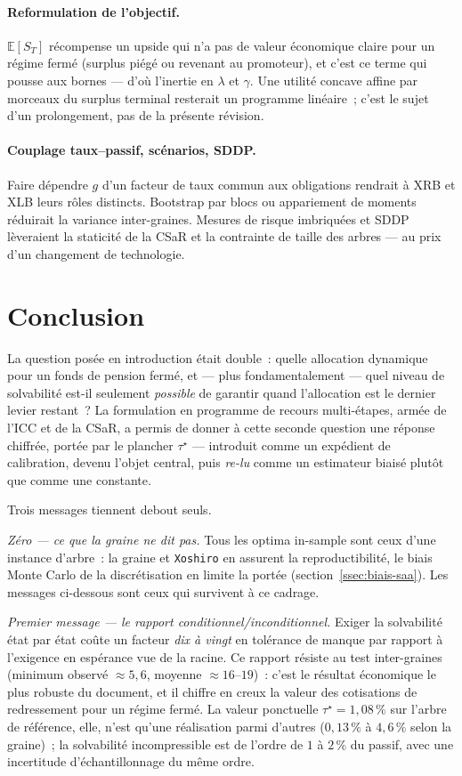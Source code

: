 \documentclass[11pt,letterpaper]{article}
\newcommand{\E}{\mathbb{E}}
\newcommand{\taustar}{\tau^{\star}}
\theoremstyle{definition}
\begin{document}
\paragraph{Reformulation de l'objectif.}
$\E[S_T]$ récompense un upside qui n'a pas de valeur économique claire pour un
régime fermé (surplus piégé ou revenant au promoteur), et c'est ce terme qui
pousse aux bornes --- d'où l'inertie en $\lambda$ et $\gamma$. Une utilité
concave affine par morceaux du surplus terminal resterait un programme
linéaire~; c'est le sujet d'un prolongement, pas de la présente révision.

\paragraph{Couplage taux--passif, scénarios, SDDP.}
Faire dépendre $g$ d'un facteur de taux commun aux obligations rendrait à XRB
et XLB leurs rôles distincts. Bootstrap par blocs ou appariement de
moments~\cite{HoylandWallace2001} réduirait la variance inter-graines.
Mesures de risque imbriquées et SDDP~\cite{PereiraPinto1991} lèveraient la
staticité de la CSaR et la contrainte de taille des arbres --- au prix d'un
changement de technologie.

\section{Conclusion}\label{sec:conclusion}

La question posée en introduction était double~: quelle allocation dynamique
pour un fonds de pension fermé, et --- plus fondamentalement --- quel niveau de
solvabilité est-il seulement \emph{possible} de garantir quand l'allocation est
le dernier levier restant~? La formulation en programme de recours multi-étapes,
armée de l'ICC et de la CSaR, a permis de donner à cette seconde question une
réponse chiffrée, portée par le plancher $\taustar$ --- introduit comme un
expédient de calibration, devenu l'objet central, puis \emph{re-lu} comme un
estimateur biaisé plutôt que comme une constante.

Trois messages tiennent debout seuls.

\emph{Zéro --- ce que la graine ne dit pas.}
Tous les optima in-sample sont ceux d'une instance d'arbre~: la graine et
\texttt{Xoshiro} en assurent la reproductibilité, le biais Monte Carlo de la
discrétisation en limite la portée (section~\ref{ssec:biais-saa}). Les messages
ci-dessous sont ceux qui survivent à ce cadrage.

\emph{Premier message --- le rapport conditionnel/inconditionnel.}
Exiger la solvabilité état par état coûte un facteur \emph{dix à vingt} en
tolérance de manque par rapport à l'exigence en espérance vue de la racine.
Ce rapport résiste au test inter-graines (minimum observé $\approx 5{,}6$,
moyenne $\approx 16$--$19$)~: c'est le résultat économique le plus robuste du
document, et il chiffre en creux la valeur des cotisations de redressement pour
un régime fermé. La valeur ponctuelle $\taustar = 1{,}08\,\%$ sur l'arbre de
référence, elle, n'est qu'une réalisation parmi d'autres ($0{,}13\,\%$ à
$4{,}6\,\%$ selon la graine)~; la solvabilité incompressible est de l'ordre de
$1$ à $2\,\%$ du passif, avec une incertitude d'échantillonnage du même ordre.
\end{document}

